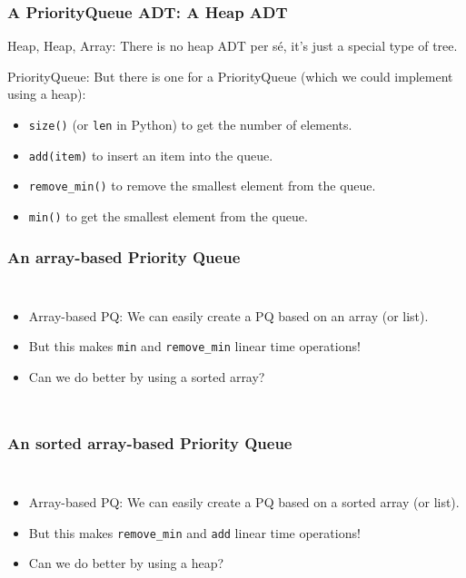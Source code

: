 \begin{frame}
	\frametitle{A PriorityQueue ADT: A Heap ADT}
Heap, Heap, Array: There is no heap ADT per sé, it's just a special type of tree.
		
PriorityQueue: 	But there is one for a PriorityQueue (which we could implement using a heap):
			\begin{itemize}
				\item \texttt{size()} (or \texttt{len} in Python) to get the number of elements.
					
				\item \texttt{add(item)} to insert an item into the queue.
					
				\item \texttt{remove\_min()} to remove the smallest element from the queue.
					
				\item \texttt{min()} to get the smallest element from the queue.
			\end{itemize}
\end{frame}

\begin{frame}
	\frametitle{An array-based Priority Queue}


	\begin{columns}[T]
		
		
			\begin{itemize}
				\item Array-based PQ:	We can easily create a PQ based on an array (or list).
				\item But this makes \texttt{min} and \texttt{remove\_min} linear time operations!
				\item Can we do better by using a sorted array?
							\end{itemize}

	\end{columns}
\end{frame}

\begin{frame}
	\frametitle{An sorted array-based Priority Queue}

	\begin{columns}[T]
		
		
			\begin{itemize}
				\item Array-based PQ:	We can easily create a PQ based on a sorted array (or list).
				\item But this makes \texttt{remove\_min} and \texttt{add} linear time operations!
				\item Can we do better by using a heap?
			\end{itemize}
	\end{columns}
\end{frame}

